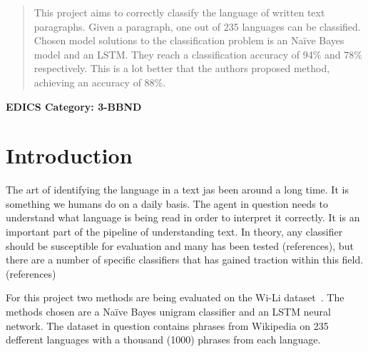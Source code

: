 \documentclass[conference]{IEEEtran}
\begin{document}




\maketitle

\begin{abstract}
This project aims to correctly classify the language of written text paragraphs. Given a paragraph, one out of 235 languages can be classified. Chosen model solutions to the classification problem is an Naïve Bayes model and an LSTM. They reach a classification accuracy of 94\% and 78\% respectively. This is a lot better that the authors proposed method, achieving an accuracy of 88\%.
\end{abstract}





\ifCLASSOPTIONpeerreview
\begin{center} \bfseries EDICS Category: 3-BBND \end{center}
\fi
%
\IEEEpeerreviewmaketitle



\section{Introduction}
The art of identifying the language in a text jas been around a long time. It is something we humans do on a daily basis. The agent in question needs to understand what language is being read in order to interpret it correctly. It is an important part of the pipeline of understanding text. In theory, any classifier should be susceptible for evaluation and many has been tested (references), but there are a number of specific classifiers that has gained traction within this field. (references)

For this project two methods are being evaluated on the Wi-Li dataset~\cite{wili}. The methods chosen are a Naïve Bayes unigram classifier and an LSTM neural network. The dataset in question contains phrases from Wikipedia on 235 defferent languages with a thousand (1000) phrases from each language.
\end{document}
